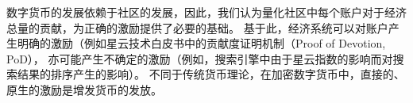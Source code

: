 数字货币的发展依赖于社区的发展，因此，我们认为量化社区中每个账户对于经济总量的贡献，为正确的激励提供了必要的基础。
基于此，经济系统可以对账户产生明确的激励（例如星云技术白皮书中的贡献度证明机制（Proof of Devotion, PoD），
亦可能产生不确定的激励（例如，搜索引擎中由于星云指数的影响而对搜索结果的排序产生的影响）。
不同于传统货币理论，在加密数字货币中，直接的、原生的激励是增发货币的发放。




\begin{comment}

\subsection{经济激励模型}
完整的讨论经济激励模型，超出了本文的范围，然而，考虑到星云指数可能产生的激励效应，有必要对星云指数之后的经济激励给出必要的说明。

星云指数衡量了一个账户对经济系统的贡献，基于此，经济系统可以对账户产生明确的激励（例如技术白皮书中的贡献度证明机制（Proof of Devotion, PoD），
亦可能产生不确定的激励（例如，搜索引擎中由于星云指数的影响而对搜索结果的排序产生的影响）。在加密数字货币中，直接的、原生的激励是增发货币的发放。

我们认为，加密数字货币的最根本的价值来源于流通，即在更多的交易中产生更多的价值

根据式~\ref{eq:currency}

当社区用户产生价值增幅大于星云币增发幅度时，星云币会对应升值或者星云币流通性增加，即用户交易频率增加，从而达到新的平衡，反之亦然。
因此在计算星云经济系统的产出时，我们采用星云指数作为衡量指标，同时我们希望该指标能够促进星云币流通速度的增加。

星云指数的物理意义是{\textbf 用户对经济系统增长的贡献}。更进一步的，所有用户的星云指数的总和，应该与经济体的整体价值正相关{\color{red} xxx}.
\end{comment}
